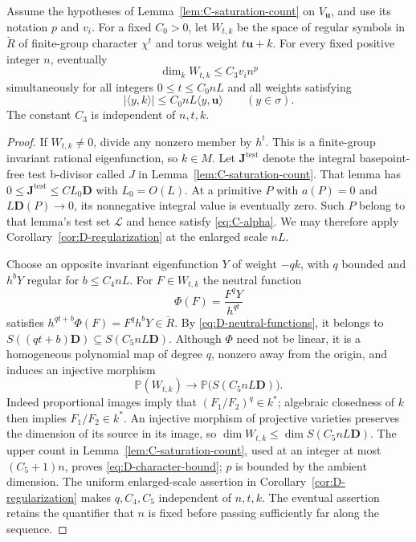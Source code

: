 \begin{corollary}
\label{cor:D-character-count}
Assume the hypotheses of Lemma~\ref{lem:C-saturation-count} on
$V_{\mathbf u}$, and use its notation $p$ and $v_i$.  For a fixed
$C_0>0$, let $W_{t,k}$ be the space of regular symbols in $\breve R$
of finite-group character $\chi^t$ and torus weight $t\mathbf u+k$.
For every fixed positive integer $n$, eventually
\begin{equation}\label{eq:D-character-bound}
 \dim_k W_{t,k}\le C_3 v_i n^p
\end{equation}
simultaneously for all integers $0\le t\le C_0nL$ and all weights
satisfying
\[
 |\langle y,k\rangle|\le C_0nL\langle y,\mathbf u\rangle
 \qquad(y\in\sigma).
\]
The constant $C_3$ is independent of $n,t,k$.
\end{corollary}

\begin{proof}
If $W_{t,k}\ne0$, divide any nonzero member by $h^t$.  This is a
finite-group invariant rational eigenfunction, so $k\in M$.
Let $\mathbf J^{\mathrm{test}}$ denote the integral basepoint-free
test b-divisor called $J$ in Lemma~\ref{lem:C-saturation-count}.
That lemma has
$0\le\mathbf J^{\mathrm{test}}\le C L_0\mathbf D$ with
$L_0=O(L)$.  At a primitive $P$ with $a(P)=0$ and
$L\mathbf D(P)\to0$, its nonnegative integral value is eventually
zero.  Such $P$ belong to that lemma's test set $\mathcal L$ and hence
satisfy \eqref{eq:C-alpha}.  We may therefore apply
Corollary~\ref{cor:D-regularization} at the enlarged scale $nL$.

Choose an opposite invariant eigenfunction $Y$ of weight $-qk$, with
$q$ bounded and $h^bY$ regular for $b\le C_4 nL$.  For
$F\in W_{t,k}$ the neutral function
\[
 \Phi(F)=\frac{F^qY}{h^{qt}}
\]
satisfies $h^{qt+b}\Phi(F)=F^q h^bY\in\breve R$.  By
\eqref{eq:D-neutral-functions}, it belongs to
$S((qt+b)\mathbf D)\subseteq S(C_5nL\mathbf D)$.
Although $\Phi$ need not be linear, it is a homogeneous polynomial map
of degree $q$, nonzero away from the origin, and induces an injective
morphism
\[
 \mathbb P(W_{t,k})\longrightarrow
 \mathbb P\bigl(S(C_5nL\mathbf D)\bigr).
\]
Indeed proportional images imply that $(F_1/F_2)^q\in k^*$;
algebraic closedness of $k$ then implies $F_1/F_2\in k^*$.
An injective morphism of projective varieties preserves the dimension
of its source in its image, so
$\dim W_{t,k}\le\dim S(C_5nL\mathbf D)$.
The upper count in Lemma~\ref{lem:C-saturation-count}, used at an
integer at most $(C_5+1)n$, proves
\eqref{eq:D-character-bound}; $p$ is bounded by the ambient dimension.
The uniform enlarged-scale assertion in
Corollary~\ref{cor:D-regularization} makes $q,C_4,C_5$ independent of
$n,t,k$.  The eventual assertion retains the quantifier that $n$ is
fixed before passing sufficiently far along the sequence.
\end{proof}

